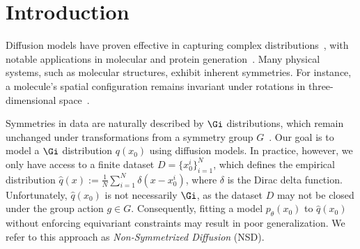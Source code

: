 \vspace{-0.5cm}
\section{Introduction}
\label{sec:intro}


Diffusion models have proven effective in capturing complex distributions~, with notable applications in molecular and protein generation~. Many physical systems, such as molecular structures, exhibit inherent symmetries. For instance, a molecule's spatial configuration remains invariant under rotations in three-dimensional space~.

Symmetries in data are naturally described by \(\Gi\) distributions, which remain unchanged under transformations from a symmetry group \(G\)~. Our goal is to model a \(\Gi\) distribution \(q(x_0)\) using diffusion models. In practice, however, we only have access to a finite dataset \(D = \{x_0^i\}_{i=1}^N\), which defines the empirical distribution \(\hat{q}(x) := \frac{1}{N} \sum_{i=1}^N \delta(x - x_0^i)\), where \(\delta\) is the Dirac delta function. Unfortunately, \(\hat{q}(x_0)\) is not necessarily \(\Gi\), as the dataset \(D\) may not be closed under the group action \(g \in G\). Consequently, fitting a model \(p_\theta(x_0)\) to \(\hat{q}(x_0)\) without enforcing equivariant constraints may result in poor generalization. We refer to this approach as \emph{Non-Symmetrized Diffusion} (NSD).

